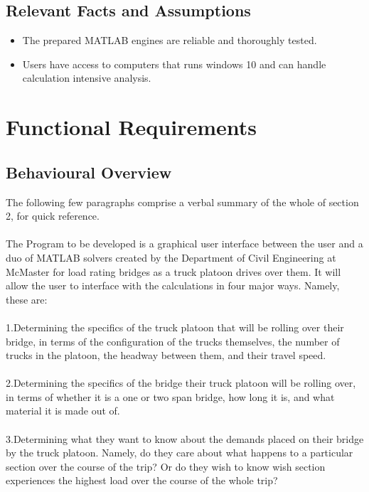 \documentclass[12pt]{article}
\begin{document}
\subsection{Relevant Facts and Assumptions}
\begin{itemize}
  \item The prepared MATLAB engines are reliable and thoroughly tested.
  \item Users have access to computers that runs windows 10 and can handle calculation intensive analysis.
\end{itemize}


\section{Functional Requirements}
\subsection{Behavioural Overview}
The following few paragraphs comprise a verbal summary of the whole of section 2, for quick reference.\\\\

\noindent The Program to be developed is a graphical user interface between the user and a duo of MATLAB solvers created by the Department of Civil Engineering at McMaster
for load rating bridges as a truck platoon drives over them. It will allow the user to interface with the calculations in four major ways. Namely, these are:\\\\ 

\noindent 1.Determining the specifics of the truck platoon that will be rolling over their bridge, in terms of the configuration of the trucks themselves, the number of trucks in
the platoon, the headway between them, and their travel speed.\\\\ 

\noindent 2.Determining the specifics of the bridge their truck platoon will be rolling over, in terms of whether it is a one or two span bridge, how long it is, and what 
material it is made out of.\\\\

\noindent 3.Determining what they want to know about the demands placed on their bridge by the truck platoon. Namely, do they care about what happens to a particular section 
over the course of the trip? Or do they wish to know wish section experiences the highest load over the course of the whole trip?\\\\
\end{document}
